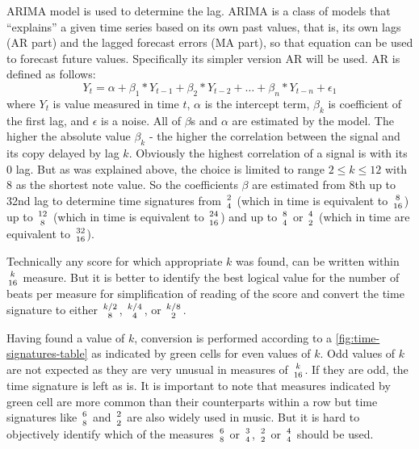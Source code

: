 \ac{ARIMA} model is used to determine the lag. \ac{ARIMA} is a class of models that ``explains'' a given time series
based on its own past values, that is, its own lags (AR part) and the lagged forecast errors (MA part), so that equation
can be used to forecast future values. Specifically its simpler version AR will be used. AR is defined as follows:
\[ Y_t = \alpha + \beta_1*Y_{t-1} + \beta_2*Y_{t-2} + \dots + \beta_n*Y_{t-n} + \epsilon_1 \]
where $Y_t$ is value measured in time $t$, $\alpha$ is the intercept term, $\beta_k$ is coefficient of the first lag,
and $\epsilon$ is a noise. All of $\beta$s and $\alpha$ are estimated by the model. The higher the absolute value
$\beta_k$ - the higher the correlation between the signal and its copy delayed by lag $k$. Obviously the highest
correlation of a signal is with its 0 lag. But as was explained above, the choice is limited to range $2 \le k \le 12$
with 8 as the shortest note value. So the coefficients $\beta$ are estimated from 8th up to 32nd lag to determine time
signatures from $2\atop4$ (which in time is equivalent to $8\atop16$) up to $12\atop8$ (which in time is equivalent to
$24\atop16$) and up to $8\atop4$ or $4\atop2$ (which in time are equivalent to $32\atop16$).

Technically any score for which appropriate $k$ was found, can be written within $k\atop16$ measure. But it is better to
identify the best logical value for the number of beats per measure for simplification of reading of the score and
convert the time signature to either $k/2\atop8$, $k/4\atop4$, or $k/8\atop2$.

Having found a value of $k$, conversion is performed according to a \cref{fig:time-signatures-table} as indicated by
green cells for even values of $k$. Odd values of $k$ are not expected as they are very unusual in measures of
$k\atop16$. If they are odd, the time signature is left as is. It is important to note that measures indicated by green
cell are more common than their counterparts within a row but time signatures like $6\atop8$ and $2\atop2$ are also
widely used in music. But it is hard to objectively identify which of the measures $6\atop8$ or $3\atop4$, $2\atop2$ or
$4\atop4$ should be used.

